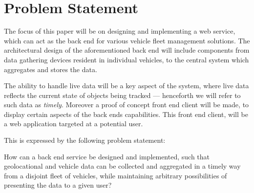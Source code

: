 \section{Problem Statement}\label{sec:problem_statement}

The focus of this paper will be on designing and implementing a web service,
which can act as the back end for various vehicle fleet management solutions.
The architectural design of the aforementioned back end will include components
from data gathering devices resident in individual vehicles,
to the central system which aggregates and stores the data.

The ability to handle live data will be a key aspect of the system,
where live data reflects the current state of objects being tracked
--- henceforth we will refer to such data as \textit{timely}.
Moreover a proof of concept front end client will be made,
to display certain aspects of the back ends capabilities.
This front end client, will be a web application targeted at a potential user.

\bigskip\noindent
This is expressed by the following problem statement:

\medskip
{\addtolength{\leftskip}{10mm}\addtolength{\rightskip}{10mm}\noindent\hrulefill\it

\noindent How can a back end service be designed and implemented,
such that geolocational and vehicle data can be collected and aggregated in a timely way from a disjoint fleet of vehicles,
while maintaining arbitrary possibilities of presenting the data to a given user?

\noindent\hrulefill

}
